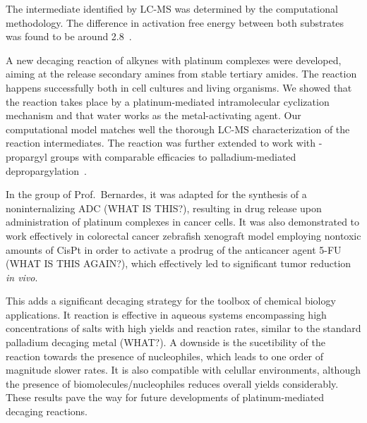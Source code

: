 
The intermediate  identified by LC-MS was determined by the computational
methodology.
The difference in activation free energy between both substrates was found to
be around 2.8~\kcalmol.

A new decaging reaction of alkynes with platinum complexes were developed,
aiming at the release secondary amines from stable tertiary amides.
The reaction happens successfully both in cell cultures and living organisms.
We showed that the reaction takes place by a platinum-mediated intramolecular
cyclization mechanism and that water works as the metal-activating agent.
Our computational model matches well the thorough LC-MS characterization of the
reaction intermediates.
The reaction was further extended to work with -propargyl groups with
comparable efficacies to palladium-mediated depropargylation~\cite{Coelho2019}.

In the group of Prof.~Bernardes, it was adapted for the synthesis of a
noninternalizing ADC (WHAT IS THIS?), resulting in drug release upon
administration of platinum complexes in cancer cells.
It was also demonstrated to work effectively in colorectal cancer zebrafish
xenograft model employing nontoxic amounts of CisPt in order to activate a
prodrug of the anticancer agent 5-FU (WHAT IS THIS AGAIN?), which effectively
led to significant tumor reduction \emph{in vivo}.

This adds a significant decaging strategy for the toolbox of chemical biology
applications.
It reaction is effective in aqueous systems encompassing high concentrations of
salts with high yields and reaction rates, similar to the standard palladium
decaging metal (WHAT?).
A downside is the sucetibility of the reaction towards the presence of
nucleophiles, which leads to one order of magnitude slower rates.
It is also compatible with celullar environments, although the presence of
biomolecules/nucleophiles reduces overall yields considerably.
These results pave the way for future developments of platinum-mediated
decaging reactions.


